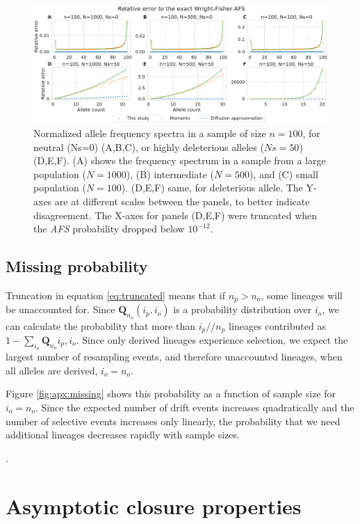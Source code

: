\documentclass[review]{elsarticle}
\newcommand{\dslash}{/\!\!/}
\newcommand{\ikcomment}[1]{{\color{blue}{IK: #1}}}
\begin{document}
\begin{figure}
  \centering
  \includegraphics[width=0.7\textheight]{fig/strong_selection_six_panel.pdf}
  \caption{Normalized allele frequency spectra in a sample of size $n=100$, for neutral (Ns=0)
    (A,B,C), or highly deleterious alleles ($Ns=50$) (D,E,F). (A) shows the frequency spectrum in a
    sample from a large population ($N=1000$), (B) intermediate ($N=500$), and (C) small population
    ($N=100$). (D,E,F) same, for deleterious allele. The Y-axes are at different scales between the
    panels, to better indicate disagreement. The X-axes for panels (D,E,F) were truncated
    when the \textit{AFS} probability dropped below $10^{-12}$. }
  \label{fig:strong-selection}
\end{figure}

\subsection{Missing probability}
\label{subsec:missing}

Truncation in equation \ref{eq:truncated} means that if $n_p > n_o$, some lineages will be
unaccounted for. Since $\mathbf{Q}_{n_o}(i_p, i_o)$ is a probability distribution over $i_o$, we can
calculate the probability that more than $i_p \dslash n_p$ lineages contributed as
$1-\sum_{i_o} \mathbf{Q}_{n_o}{i_p, i_o}$. Since only derived lineages experience selection, we
expect the largest number of resampling events, and therefore unaccounted lineages, when all alleles
are derived, $i_o = n_o$.

Figure \ref{fig:apx:missing} shows this probability as a function of sample size for $i_o = n_o$.
Since the expected number of drift events increases quadratically and the number of selective events
increases only linearly, the probability that we need additional lineages decreases rapidly with
sample sizes.

\ikcomment{This figure needs to be updated}.

\section{Asymptotic closure properties}
\label{sec:asympt}
\end{document}
